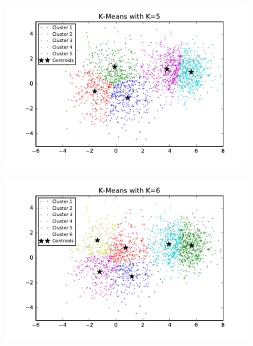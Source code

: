 \begin{description}
\begin{description}
\begin{figure}[!h]
\begin{subfigure}[b]{0.475\textwidth}
        \end{subfigure}
        \begin{subfigure}[b]{0.475\textwidth}  
            \centering 
            \includegraphics[width=\textwidth]{./figures/clustering_kMeans_5.pdf}
        \end{subfigure}
        \hfill
        \begin{subfigure}[b]{0.475\textwidth}   
            \centering 
            \includegraphics[width=\textwidth]{./figures/clustering_kMeans_6.pdf}
        \end{subfigure}
        \begin{subfigure}[b]{0.475\textwidth}   
            \centering 

\end{subfigure}
\end{figure}
\end{description}
\end{description}
